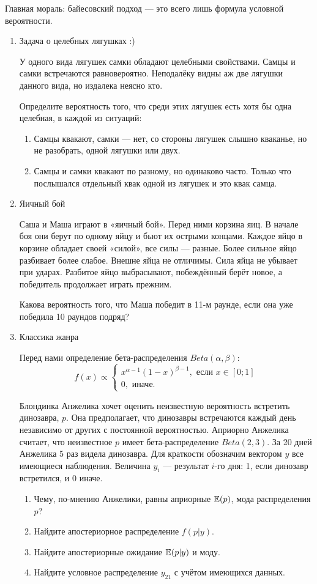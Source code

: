 Главная мораль: байесовский подход — это всего лишь формула условной вероятности.

\begin{enumerate}
\item Задача о целебных лягушках :)

У одного вида лягушек самки обладают целебными свойствами. Самцы и самки
встречаются равновероятно. Неподалёку видны аж две лягушки данного вида, но
издалека неясно кто.

Определите вероятность того, что среди этих лягушек есть хотя бы одна целебная,
в каждой из ситуаций:
\begin{enumerate}
\item Самцы квакают, самки — нет, со стороны лягушек слышно кваканье, но не разобрать,
одной лягушки или двух.
\item Самцы и самки квакают по разному, но одинаково часто. Только что послышался
отдельный квак одной из лягушек и это квак самца.
\end{enumerate}

\item Яичный бой

Саша и Маша играют в «яичный бой». Перед ними корзина яиц. В начале боя они берут
по одному яйцу и бьют их острыми концами. Каждое яйцо в корзине обладает своей «силой»,
все силы — разные. Более сильное яйцо разбивает более слабое. Внешне яйца не отличимы.
Сила яйца не убывает при ударах. Разбитое яйцо выбрасывают, побеждённый берёт новое,
а победитель продолжает играть прежним.

Какова вероятность того, что Маша победит в 11-м раунде, если она уже победила
10 раундов подряд?

\item Классика жанра

Перед нами определение бета-распределения $Beta(\alpha, \beta)$:
\[
f(x) \propto \begin{cases}
x^{\alpha-1}(1-x)^{\beta-1}, \text{ если } x\in[0;1] \\
0, \text{ иначе.}
\end{cases}
\]

Блондинка Анжелика хочет оценить неизвестную вероятность встретить динозавра, $p$.
Она предполагает, что динозавры встречаются каждый день независимо от других с
постоянной вероятностью. Априорно Анжелика считает, что неизвестное $p$ имеет
бета-распределение $Beta(2, 3)$. За 20 дней Анжелика 5 раз видела динозавра.
Для краткости обозначим вектором $y$ все имеющиеся наблюдения. Величина $y_i$ —
результат $i$-го дня: 1, если динозавр встретился, и 0 иначе.
\begin{enumerate}
\item Чему, по-мнению Анжелики, равны априорные $\operatorname{\mathbb{E}}(p)$, мода распределения $p$?
\item Найдите апостериорное распределение $f(p|y)$.
\item Найдите апостериорные ожидание $\operatorname{\mathbb{E}}(p|y)$ и моду.
\item Найдите условное распределение $y_{21}$ с учётом имеющихся данных.
\end{enumerate}


\end{enumerate}
